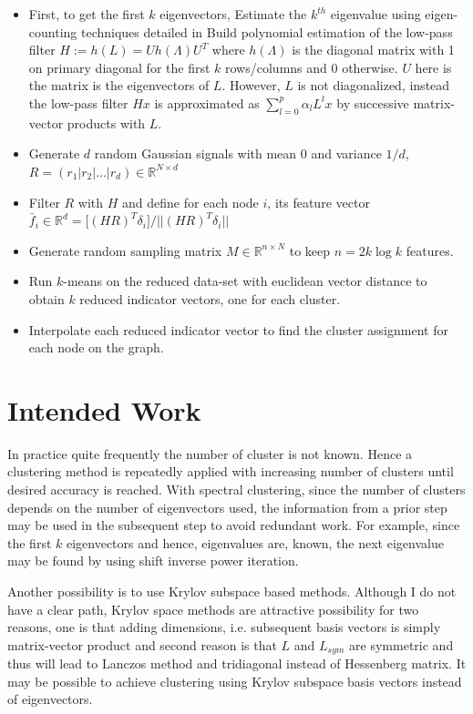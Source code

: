 \documentclass[10pt,a4paper, nocenter]{report}
\newcommand{\norm}[1]{\lvert\lvert {#1} \rvert\rvert}
\begin{document}
    \begin{itemize}
        \item First, to get the first $k$ eigenvectors,  
            \subitem Estimate the $k^{th}$ eigenvalue using eigen-counting techniques detailed in \cite{Di13efficientestimation} 
            \subitem Build polynomial estimation of the low-pass filter $H := h(L) = U h(\Lambda) U^T$ where $h({\Lambda})$ is the diagonal matrix with 1 on primary diagonal for the first $k$ rows/columns and 0 otherwise. $U$ here is the matrix is the eigenvectors of $L$. However, $L$ is not diagonalized, instead the low-pass filter $Hx$ is approximated as $\sum_{l=0}^{p}\alpha_l L^{l}x$ by successive matrix-vector products with $L$.
        \item  Generate $d$ random Gaussian signals with mean $0$ and variance $1/d$, $R = (r_1|r_2|\dots|r_d) \in \mathbb{R}^{N\times d}$
        \item Filter $R$ with $H$ and define for each node $i$, its feature vector $\bar{f}_i \in \mathbb{R}^d = \big[ (HR)^T \delta_i \big] / \norm{(HR)^T \delta_i} $
        \item Generate random sampling matrix $M\in \mathbb{R}^{n\times N}$ to keep $n=2k \log{k}$ features. 
        \item Run $k$-means on the reduced data-set with euclidean vector distance to obtain $k$ reduced indicator vectors, one for each cluster. 
        \item Interpolate each reduced indicator vector to find the cluster assignment for each node on the graph.
    \end{itemize}

    \chapter{Intended Work}
    In practice quite frequently the number of cluster is not known. Hence a clustering method is repeatedly applied with increasing number of clusters until desired accuracy is reached. With spectral clustering, since the number of clusters depends on the number of eigenvectors used, the information from a prior step may be used in the subsequent step to avoid redundant work. For example, since the first $k$ eigenvectors and hence, eigenvalues are, known, the next eigenvalue may be found by using shift inverse power iteration. 

    Another possibility is to use Krylov subspace based methods. Although I do not have a clear path, Krylov space methods are attractive possibility for two reasons, one is that adding dimensions, i.e. subsequent basis vectors is simply matrix-vector product and second reason is that $L$ and $L_{sym}$ are symmetric and thus will lead to Lanczos method and tridiagonal instead of Hessenberg matrix. It may be possible to achieve clustering using Krylov subspace basis vectors instead of eigenvectors. 
\end{document}
